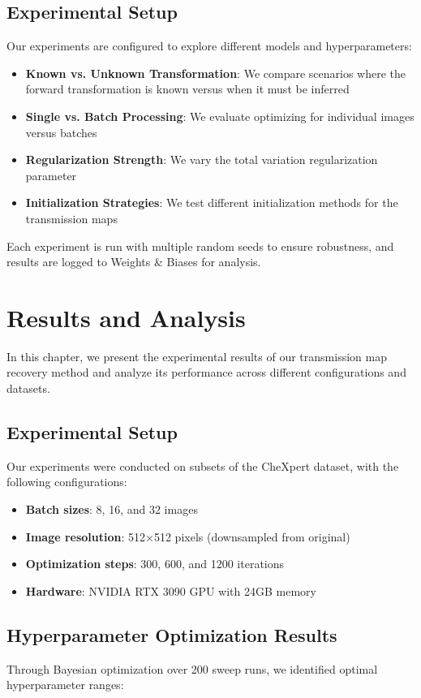 \documentclass[nomenclature, english, bibtex]{kththesis}
\numberwithin{listing}{chapter}
\begin{document}
\section{Experimental Setup}
Our experiments are configured to explore different models and hyperparameters:

\begin{itemize}
    \item \textbf{Known vs. Unknown Transformation}: We compare scenarios where the forward transformation is known versus when it must be inferred
    \item \textbf{Single vs. Batch Processing}: We evaluate optimizing for individual images versus batches
    \item \textbf{Regularization Strength}: We vary the total variation regularization parameter
    \item \textbf{Initialization Strategies}: We test different initialization methods for the transmission maps
\end{itemize}

Each experiment is run with multiple random seeds to ensure robustness, and results are logged to Weights \& Biases for analysis.
\chapter{Results and Analysis}
\label{ch:resultsAndAnalysis}

In this chapter, we present the experimental results of our transmission map recovery method and analyze its performance across different configurations and datasets.

\section{Experimental Setup}
Our experiments were conducted on subsets of the CheXpert dataset, with the following configurations:
\begin{itemize}
    \item \textbf{Batch sizes}: 8, 16, and 32 images
    \item \textbf{Image resolution}: 512×512 pixels (downsampled from original)
    \item \textbf{Optimization steps}: 300, 600, and 1200 iterations
    \item \textbf{Hardware}: NVIDIA RTX 3090 GPU with 24GB memory
\end{itemize}

\section{Hyperparameter Optimization Results}
Through Bayesian optimization over 200 sweep runs, we identified optimal hyperparameter ranges:
\end{document}
